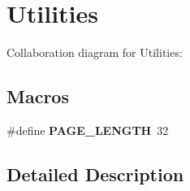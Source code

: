 \hypertarget{group___utilities}{}\section{Utilities}
\label{group___utilities}
Collaboration diagram for Utilities\+:
\subsection*{Macros}
\begin{DoxyCompactItemize}
\item 
\mbox{\label{group___utilities_gaa583f25d8bd438def94d50dff97b468d}} 
\#define {\bfseries P\+A\+G\+E\+\_\+\+L\+E\+N\+G\+TH}~32
\end{DoxyCompactItemize}


\subsection{Detailed Description}

